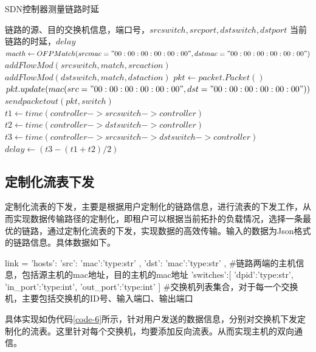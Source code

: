 \begin{algorithm}[!htb]
    \caption{SDN控制器测量链路时延}
    \label{code-5}
    \begin{algorithmic}[1] %
        \Require 链路的源、目的交换机信息，端口号，$srcswitch,srcport,dstswitch,dstport$
        \Ensure 当前链路的时延，$delay$
        	\State $macth \gets OFPMatch(srcmac="00:00:00:00:00:00",dstmac="00:00:00:00:00:00")$
        	\State $addFlowMod(srcswitch,match,srcaction)$
        	\State $addFlowMod(dstswitch,match,dstaction)$
        \EndFunction
        	\State $pkt \gets packet.Packet()$
        	\State $pkt.update(mac(src="00:00:00:00:00:00",dst="00:00:00:00:00:00"))$
        	\State $sendpacketout(pkt, switch)$
        \EndFunction
         	\State $t1 \gets time(controller->srcswitch->controller)$
         	\State $t2 \gets time(controller->dstswitch->controller)$
         	\State $t3 \gets time(controller->srcswitch->dstswitch->controller)$
         	\State $delay \gets (t3-(t1+t2)/2)$
         	\State {}
        \EndFunction
    \end{algorithmic}
\end{algorithm}

\subsection{定制化流表下发}
定制化流表的下发，主要是根据用户定制化的链路信息，进行流表的下发工作，从而实现数据传输路径的定制化，即租户可以根据当前拓扑的负载情况，选择一条最优的链路，通过定制化流表的下发，实现数据的高效传输。输入的数据为Json格式的链路信息。具体数据如下。

\begin{python} 
link = {
	'hosts':{
		'src':{
			'mac':'type:str'
		},
		'dst':{
			'mac':'type:str'
		}
	}, #链路两端的主机信息，包括源主机的mac地址，目的主机的mac地址
	'switches':[
		{
			'dpid':'type:str',
			'in_port':'type:int',
			'out_port':'type:int'
		}
	] #交换机列表集合，对于每一个交换机，主要包括交换机的ID号、输入端口、输出端口
}
\end{python}

具体实现如伪代码\ref{code-6}所示，针对用户发送的数据信息，分别对交换机下发定制化的流表。这里针对每个交换机，均要添加反向流表。从而实现主机的双向通信。

